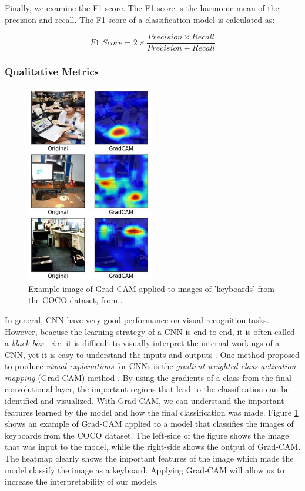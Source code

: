 \documentclass[12pt]{article}
\begin{document}
Finally, we examine the F1 score. The F1 score is the harmonic mean of the
precision and recall. The F1 score of a classification model is calculated as:

\begin{equation}
    \textit{F1 Score} = 2 \times \frac{Precision \times Recall}{Precision + Recall}
\end{equation}

\newpage
\subsubsection{Qualitative Metrics}

\begin{figure}[h]
    \centering
    \includegraphics[width=0.5\textwidth]{assets/images/gradcam.jpg}
    \caption{Example image of Grad-CAM applied to images of 'keyboards' from the
        COCO dataset, from \citeauthor*{selvaraju_grad_2020}
        \cite{selvaraju_grad_2020}. }
    \label{fig:gradcam}
\end{figure}

In general, CNN have very good performance on visual recognition tasks. However,
beacuse the learning strategy of a CNN is end-to-end, it is often called a
\textit{black box} - \textit{i.e.} it is difficult to visually interpret the
internal workings of a CNN, yet it is easy to understand the inputs and outputs
\cite{zhang_visual_2018}. One method proposed to produce \textit{visual
    explanations} for CNNs is the \textit{gradient-weighted class activation
    mapping} (Grad-CAM) method \cite{selvaraju_grad_2020}. By using the gradients of
a class from the final convolutional layer, the important regions that lead to
the classification can be identified and visualized. With Grad-CAM, we can
understand the important features learned by the model and how the final
classification was made. Figure \ref{fig:gradcam} shows an example of Grad-CAM
applied to a model that classifies the images of keyboards from the COCO
dataset. The left-side of the figure shows the image that was input to the
model, while the right-side shows the output of Grad-CAM. The heatmap clearly
shows the important features of the image which made the model classify the
image as a keyboard. Applying Grad-CAM will allow us to increase the
interpretability of our models.
\end{document}
